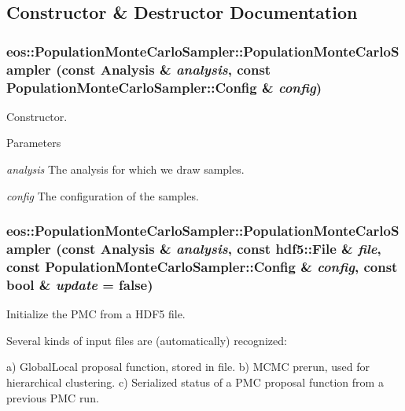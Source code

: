 \subsection{Constructor \& Destructor Documentation}
\hypertarget{classeos_1_1PopulationMonteCarloSampler_af17458cf45dd30ed7328b88af1ad7ffd}{
\subsubsection[{PopulationMonteCarloSampler}]{\setlength{\rightskip}{0pt plus 5cm}eos::PopulationMonteCarloSampler::PopulationMonteCarloSampler (const {\bf Analysis} \& {\em analysis}, \/  const {\bf PopulationMonteCarloSampler::Config} \& {\em config})}}
\label{classeos_1_1PopulationMonteCarloSampler_af17458cf45dd30ed7328b88af1ad7ffd}
Constructor.


\begin{DoxyParams}{Parameters}
\item[{\em analysis}]The analysis for which we draw samples. \item[{\em config}]The configuration of the samples. \end{DoxyParams}
\hypertarget{classeos_1_1PopulationMonteCarloSampler_a0a691ab9f41782d8c059685a3bc1998c}{
\subsubsection[{PopulationMonteCarloSampler}]{\setlength{\rightskip}{0pt plus 5cm}eos::PopulationMonteCarloSampler::PopulationMonteCarloSampler (const {\bf Analysis} \& {\em analysis}, \/  const {\bf hdf5::File} \& {\em file}, \/  const {\bf PopulationMonteCarloSampler::Config} \& {\em config}, \/  const bool \& {\em update} = {\ttfamily false})}}
\label{classeos_1_1PopulationMonteCarloSampler_a0a691ab9f41782d8c059685a3bc1998c}
Initialize the PMC from a HDF5 file.

Several kinds of input files are (automatically) recognized:

a) GlobalLocal proposal function, stored in file. b) MCMC prerun, used for hierarchical clustering. c) Serialized status of a PMC proposal function from a previous PMC run.

